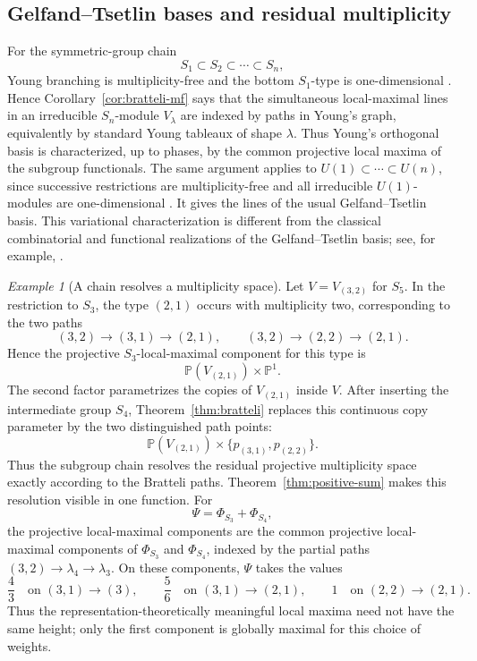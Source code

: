 \documentclass[10pt]{amsart}
\theoremstyle{remark}
\newtheorem{example}[theorem]{Example}
\newcommand{\PP}{\mathbb P}
\begin{document}
\subsection{Gelfand--Tsetlin bases and residual multiplicity}

For the symmetric-group chain
\[
 S_1\subset S_2\subset\cdots\subset S_n,
\]
Young branching is multiplicity-free and the bottom $S_1$-type is one-dimensional
\cite{OkounkovVershik}. Hence
Corollary~\ref{cor:bratteli-mf} says that the simultaneous local-maximal lines in an irreducible
$S_n$-module $V_\lambda$ are indexed by paths in Young's graph, equivalently by standard Young tableaux
of shape $\lambda$. Thus Young's orthogonal basis is characterized, up to phases, by the common
projective local maxima of the subgroup functionals. The same argument applies to
$U(1)\subset\cdots\subset U(n)$, since successive restrictions are multiplicity-free and all irreducible
$U(1)$-modules are one-dimensional \cite{GoodmanWallach}. It gives the lines of the usual
Gelfand--Tsetlin basis. This variational
characterization is different from the classical combinatorial and functional realizations of the
Gelfand--Tsetlin basis; see, for example, \cite{HershLenart,Artamonov}.

\begin{example}[A chain resolves a multiplicity space]\label{ex:S5}
Let $V=V_{(3,2)}$ for $S_5$. In the restriction to $S_3$, the type $(2,1)$ occurs with multiplicity
two, corresponding to the two paths
\[
 (3,2)\to(3,1)\to(2,1),
 \qquad
 (3,2)\to(2,2)\to(2,1).
\]
Hence the projective $S_3$-local-maximal component for this type is
\[
 \PP(V_{(2,1)})\times\PP^1.
\]
The second factor parametrizes the copies of $V_{(2,1)}$ inside $V$. After inserting the intermediate
group $S_4$, Theorem~\ref{thm:bratteli} replaces this continuous copy parameter by the two distinguished
path points:
\[
 \PP(V_{(2,1)})\times\{p_{(3,1)},p_{(2,2)}\}.
\]
Thus the subgroup chain resolves the residual projective multiplicity space exactly according to the
Bratteli paths. Theorem~\ref{thm:positive-sum} makes this resolution visible in one function. For
\[
 \Psi=\Phi_{S_3}+\Phi_{S_4},
\]
the projective local-maximal components are the common projective local-maximal components of
$\Phi_{S_3}$ and $\Phi_{S_4}$, indexed by the partial paths $(3,2)\to\lambda_4\to\lambda_3$.
On these components, $\Psi$ takes the values
\[
 \frac43\quad\text{on }(3,1)\to(3),
 \qquad
 \frac56\quad\text{on }(3,1)\to(2,1),
 \qquad
 1\quad\text{on }(2,2)\to(2,1).
\]
Thus the representation-theoretically meaningful local maxima need not have the same height; only the
first component is globally maximal for this choice of weights.
\end{example}
\end{document}
